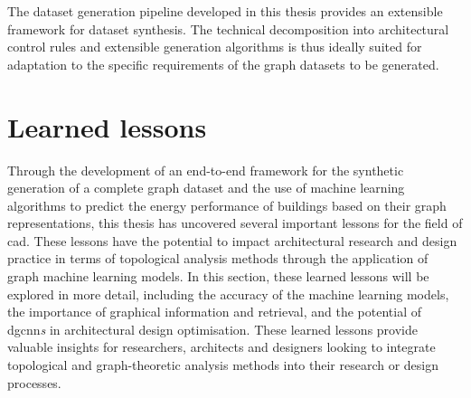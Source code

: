 \documentclass[a4paper, 12pt]{report}
\begin{document}
The dataset generation pipeline developed in this thesis provides an extensible framework for dataset synthesis. The technical decomposition into architectural control rules and extensible generation algorithms is thus ideally suited for adaptation to the specific requirements of the graph datasets to be generated.

\section{Learned lessons}\label{sec:learned-lessons}

Through the development of an end-to-end framework for the synthetic generation of a complete graph dataset and the use of machine learning algorithms to predict the energy performance of buildings based on their graph representations, this thesis has uncovered several important lessons for the field of \acrlong{cad}. These lessons have the potential to impact architectural research and design practice in terms of topological analysis methods through the application of graph machine learning models. In this section, these learned lessons will be explored in more detail, including the accuracy of the machine learning models, the importance of graphical information and retrieval, and the potential of \acrshort{dgcnn}\textit{s} in architectural design optimisation. These learned lessons provide valuable insights for researchers, architects and designers looking to integrate topological and graph-theoretic analysis methods into their research or design processes.
\end{document}
